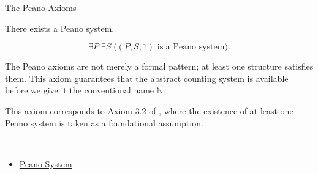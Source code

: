 \begin{topicbox}{The Peano Axioms}
\begin{tcolorbox}[colback=axiombox, colframe=axiomborder, arc=2pt,
  left=6pt, right=6pt, top=4pt, bottom=4pt,
  title={\small\textbf{Axiom (Existence of a Peano System)}},
  fonttitle=\small\bfseries]
\begin{axiom}
\label{ax:peano-system-existence}
There exists a Peano system.
\end{axiom}
\end{tcolorbox}

\begin{remark*}
\[
\exists P\;\exists S\;\bigl((P,S,1)\text{ is a Peano system}\bigr).
\]
\end{remark*}

\begin{remark*}[Interpretation]
The Peano axioms are not merely a formal pattern; at least one structure
satisfies them. This axiom guarantees that the abstract counting system is
available before we give it the conventional name $\mathbb{N}$.
\end{remark*}

\begin{remark*}
This axiom corresponds to Axiom 3.2 of
\citet{FefermanNumberSystems1964}, where the existence of at least one Peano
system is taken as a foundational assumption.
\end{remark*}

\begin{remark*}[Dependencies]~\\
\begin{itemize}
  \item \hyperref[def:peano-system]{Peano System}
\end{itemize}
\end{remark*}
\end{topicbox}
